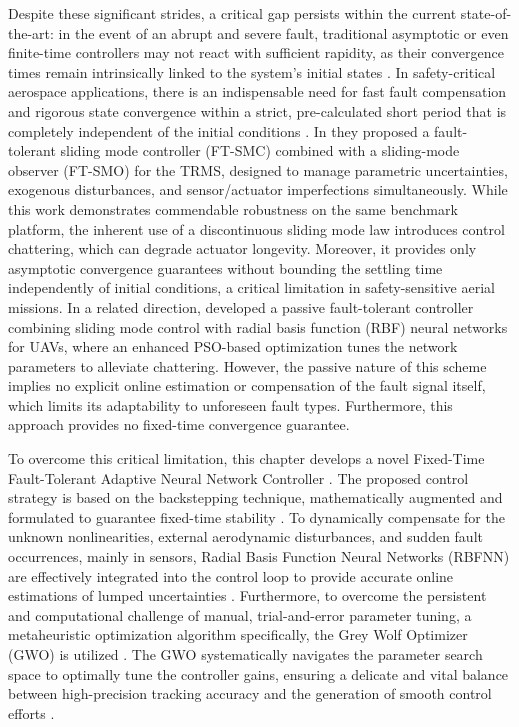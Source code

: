 Despite these significant strides, a critical gap persists within the current state-of-the-art: in the event of an abrupt and severe fault, traditional asymptotic or even finite-time controllers may not react with sufficient rapidity, as their convergence times remain intrinsically linked to the system's initial states \cite{Bhat2000, Polyakov2012}. In safety-critical aerospace applications, there is an indispensable need for fast fault compensation and rigorous state convergence within a strict, pre-calculated short period that is completely independent of the initial conditions \cite{fxt, Zuo2018}. In\cite{panda2025} they proposed a fault-tolerant sliding mode controller (FT-SMC) combined with a sliding-mode observer (FT-SMO) for the TRMS, designed to manage parametric uncertainties, exogenous disturbances, and sensor/actuator imperfections simultaneously. While this work demonstrates commendable robustness on the same benchmark platform, the inherent use of a discontinuous sliding mode law introduces control chattering, which can degrade actuator longevity. Moreover, it provides only asymptotic convergence guarantees without bounding the settling time independently of initial conditions, a critical limitation in safety-sensitive aerial missions. In a related direction, \cite{zhang2025_rbf} developed a passive fault-tolerant controller combining sliding mode control with radial basis function (RBF) neural networks for UAVs, where an enhanced PSO-based optimization tunes the network parameters to alleviate chattering. However, the passive nature of this scheme implies no explicit online estimation or compensation of the fault signal itself, which limits its adaptability to unforeseen fault types. Furthermore, this approach provides no fixed-time convergence guarantee.

To overcome this critical limitation, this chapter develops a novel Fixed-Time Fault-Tolerant Adaptive Neural Network Controller \cite{my1article, Bacha2024}. The proposed control strategy is based on the backstepping technique, mathematically augmented and formulated to guarantee fixed-time stability \cite{lemma2}. To dynamically compensate for the unknown nonlinearities, external aerodynamic disturbances, and sudden fault occurrences, mainly in sensors, Radial Basis Function Neural Networks (RBFNN) are effectively integrated into the control loop to provide accurate online estimations of lumped uncertainties \cite{Park1991, rbfnn1}. Furthermore, to overcome the persistent and computational challenge of manual, trial-and-error parameter tuning, a metaheuristic optimization algorithm specifically, the Grey Wolf Optimizer (GWO) is utilized \cite{gwo}. The GWO systematically navigates the parameter search space to optimally tune the controller gains, ensuring a delicate and vital balance between high-precision tracking accuracy and the generation of smooth control efforts \cite{9064786, glida_thesis}.

